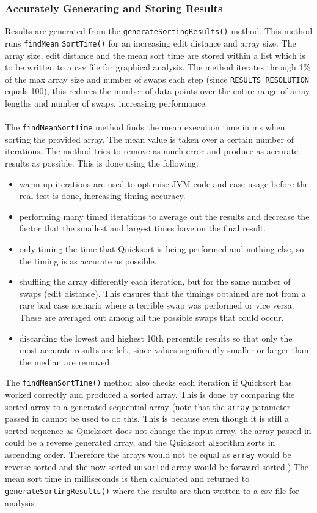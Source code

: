 \documentclass{article}
\begin{document}
\subsubsection{Accurately Generating and Storing Results}
Results are generated from the \verb+generateSortingResults()+ method. This method runs \verb+findMean+ \verb+SortTime()+ for an increasing edit distance and array size. The array size, edit distance and the mean sort time are stored within a list which is to be written to a csv file for graphical analysis. The method iterates through 1\% of the max array size and number of swaps each step (since \verb+RESULTS_RESOLUTION+ equals 100), this reduces the number of data points over the entire range of array lengths and number of swaps, increasing performance.\\ \\ \noindent The \verb+findMeanSortTime+ method finds the mean execution time in ms when sorting the provided array. The mean value is taken over a certain number of iterations. The method tries to remove as much error and produce as accurate results as possible. This is done using the following:
\begin{itemize}
\item warm-up iterations are used to optimise JVM code and case usage before the real test is done, increasing timing accuracy.
\item performing many timed iterations to average out the results and decrease the factor that the smallest and largest times have on the final result.
\item only timing the time that Quicksort is being performed and nothing else, so the timing is as accurate as possible.
\item shuffling the array differently each iteration, but for the same number of swaps (edit distance). This ensures that the timings obtained are not from a rare bad case scenario where a terrible swap was performed or vice versa. These are averaged out among all the possible swaps that could occur.
\item discarding the lowest and highest 10th percentile results so that only the most accurate results are left, since values significantly smaller or larger than the median are removed.
\end{itemize}
The \verb+findMeanSortTime()+ method also checks each iteration if Quicksort has worked correctly and produced a sorted array. This is done by comparing the sorted array to a generated sequential array (note that the \verb+array+ parameter passed in cannot be used to do this. This is because even though it is still a sorted sequence as Quicksort does not change the input array, the array passed in could be a reverse generated array, and the Quicksort algorithm sorts in ascending order. Therefore the arrays would not be equal as \verb+array+ would be reverse sorted and the now sorted \verb+unsorted+ array would be forward sorted.) The mean sort time in milliseconds is then calculated and returned to \verb+generateSortingResults()+ where the results are then written to a csv file for analysis.
\end{document}
